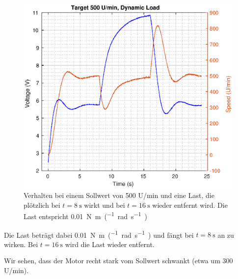 \begin{figure}[H]
    \centering
    \includegraphics[width=\imagewidth]{images/target_500_dynamic_load}
    \caption{Verhalten bei einem Sollwert von 500 U/min und eine Last, die pl\"otzlich bei $t=\SI{8}{\second}$ wirkt und bei $t=\SI{16}{\second}$ wieder entfernt wird. Die Last entspricht \SI{0.01}{\newton\meter\per(\radian\per\second)}}
    \label{fig:target_500_dynamic_load}
\end{figure}

Die Last  betr\"agt dabei \SI{0.01}{\newton\meter\per(\radian\per\second)} und
f\"angt bei $t=\SI{8}{\second}$ an zu  wirken.  Bei  $t=\SI{16}{\second}$ wird
die Last wieder entfernt.

Wir sehen, dass der Motor  recht  stark  vom  Sollwert  schwankt  (etwa um 300
U/min).

